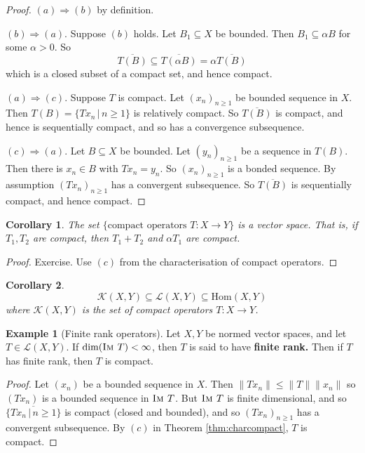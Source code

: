 \documentclass[10pt, oneside, reqno]{amsart}
\theoremstyle{plain}%
\newtheorem*{cor}{Corollary}
\theoremstyle{definition}
\newtheorem{exmp}[thm]{Example}
\theoremstyle{remark}
\newcommand{\given}{ \, | \,}
\newcommand{\im}{\textsc{Im\ }}
\begin{document}
\begin{proof}
    $(a) \Rightarrow (b)$ by definition.
    
    $(b) \Rightarrow (a)$.  Suppose $(b)$ holds.  Let $B_1 \subseteq X$ be bounded.  Then $B_1 \subseteq \alpha B$ for some $\alpha > 0$.  So \[
        \overline{T(B)} \subseteq \overline{T(\alpha B)} = \alpha \overline{T(B)}
    \] which is a closed subset of a compact set, and hence compact.  
    
    $(a) \Rightarrow (c)$.  Suppose $T$ is compact.  Let $(x_n)_{n \geq 1}$ be bounded sequence in $X$.  Then $T(B) = \{ Tx_n \given n \geq 1 \}$ is relatively compact.  So $\overline{T(B)}$ is compact, and hence is sequentially compact, and so has a convergence subsequence.
    
    $(c) \Rightarrow (a)$.  Let $B \subseteq X$ be bounded.  Let $(y_n)_{n \geq 1}$ be a sequence in $T(B)$.  Then there is $x_n \in B$ with $Tx_n = y_n$.  So $(x_n)_{n \geq 1}$ is a bonded sequence.  By assumption $(Tx_n)_{n \geq 1}$ has a convergent subsequence.  So $\overline{T(B)}$ is sequentially compact, and hence compact.
\end{proof}

\begin{cor}
    The set $\{ \text{compact operators $T : X \rightarrow Y$}\}$ is a vector space.  That is, if $T_1, T_2$ are compact, then $T_1 + T_2$ and $\alpha T_1$ are compact.  
\end{cor}

\begin{proof}
    Exercise.  Use $(c)$ from the characterisation of compact operators.
\end{proof}

\begin{cor}
    \[
        \mathcal K(X,Y) \subseteq \mathcal L(X, Y) \subseteq \text{Hom}(X,Y)
    \] where $\mathcal K(X,Y)$ is the set of compact operators $T : X \rightarrow Y$. 
\end{cor}

\begin{exmp}[Finite rank operators]  
    Let $X, Y$ be normed vector spaces, and let $T \in \mathcal L(X,Y)$.  If $\dim(\im T) < \infty$, then $T$ is said to have \textbf{finite rank.}  Then if $T$ has finite rank, then $T$ is compact.
\end{exmp}

\begin{proof}
    Let $(x_n)$ be a bounded sequence in $X$.  Then $\| Tx_n \| \leq \| T \| \| x_n \|$ so $(Tx_n)$ is a bounded sequence in $\im T$.  But $\im T$ is finite dimensional, and so $\overline{ \{ Tx_n \given n \geq 1 \}}$ is compact (closed and bounded), and so $(Tx_n)_{n \geq 1}$ has a convergent subsequence.  By $(c)$ in Theorem \ref{thm:charcompact}, $T$ is compact. 
\end{proof}
\end{document}
